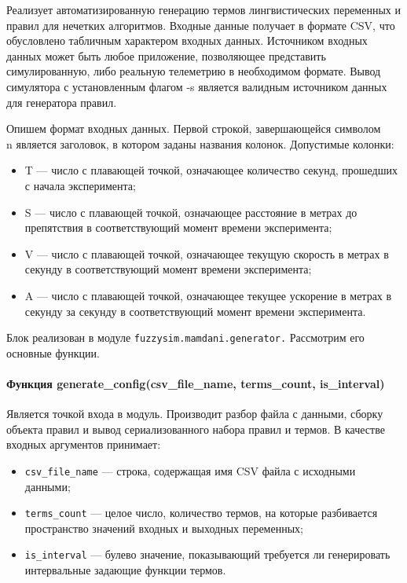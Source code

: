 Реализует автоматизированную генерацию термов лингвистических переменных и правил для нечетких алгоритмов. Входные данные получает в формате CSV, что обусловлено табличным характером входных данных. Источником входных данных может быть любое приложение, позволяющее представить симулированную, либо реальную телеметрию в необходимом формате. Вывод симулятора с установленным флагом -s является валидным источником данных для генератора правил.

Опишем формат входных данных. Первой строкой, завершающейся символом \\n является заголовок, в котором заданы названия колонок. Допустимые колонки:

\begin{itemize}
\item T — число с плавающей точкой, означающее количество секунд, прошедших с начала эксперимента;
\item S — число с плавающей точкой, означающее расстояние в метрах до препятствия в соответствующий момент времени эксперимента;
\item V — число с плавающей точкой, означающее текущую скорость в метрах в секунду в соответствующий момент времени эксперимента;
\item A — число с плавающей точкой, означающее текущее ускорение в метрах в секунду за секунду в соответствующий момент времени эксперимента.
\end{itemize}

Блок реализован в модуле  \lstinline!fuzzysim.mamdani.generator.! Рассмотрим его основные функции.

\paragraph{Функция generate\_config(csv\_file\_name, terms\_count, is\_interval)}

Является точкой входа в модуль. Производит разбор файла с данными, сборку объекта правил и вывод сериализованного набора правил и термов. В качестве входных аргументов принимает:

\begin{itemize}
	\item \lstinline!csv_file_name! — строка, содержащая имя CSV файла с исходными данными;
	\item \lstinline!terms_count! — целое число, количество термов, на которые разбивается пространство значений входных и выходных переменных;
	\item \lstinline!is_interval! — булево значение, показывающий требуется ли генерировать интервальные задающие функции термов.
\end{itemize}

